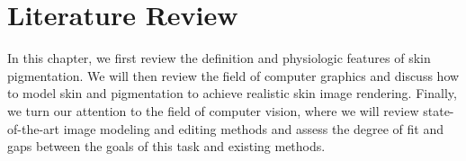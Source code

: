 
\chapter{Literature Review}
\begin{spacing}{1.5}
\setlength{\parskip}{0.3in}

In this chapter, we first review the definition and physiologic features of skin pigmentation. We will then review the field of computer graphics and discuss how to model skin and pigmentation to achieve realistic skin image rendering. Finally, we turn our attention to the field of computer vision, where we will review state-of-the-art image modeling and editing methods and assess the degree of fit and gaps between the goals of this task and existing methods.

\end{spacing}
